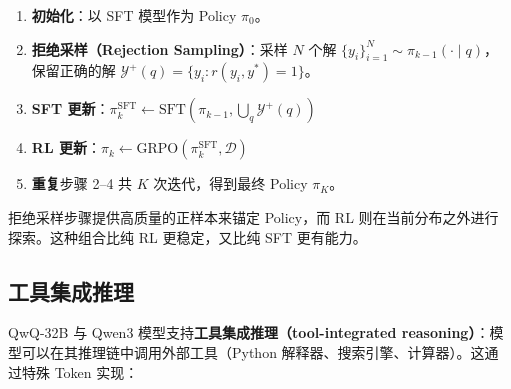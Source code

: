\begin{enumerate}
  \item \textbf{初始化}：以 SFT 模型作为 Policy $\pi_0$。
  \item \textbf{拒绝采样（Rejection Sampling）}：采样 $N$ 个解 $\{y_i\}_{i=1}^N \sim \pi_{k-1}(\cdot \mid q)$，保留正确的解 $\mathcal{Y}^+(q) = \{y_i : r(y_i, y^*) = 1\}$。
  \item \textbf{SFT 更新}：$\pi_k^{\text{SFT}} \leftarrow \text{SFT}(\pi_{k-1}, \bigcup_q \mathcal{Y}^+(q))$
  \item \textbf{RL 更新}：$\pi_k \leftarrow \text{GRPO}(\pi_k^{\text{SFT}}, \mathcal{D})$
  \item \textbf{重复}步骤 2--4 共 $K$ 次迭代，得到最终 Policy $\pi_K$。
\end{enumerate}

拒绝采样步骤提供高质量的正样本来锚定 Policy，而 RL 则在当前分布之外进行探索。这种组合比纯 RL 更稳定，又比纯 SFT 更有能力。

\subsection{工具集成推理}
\label{tool-integrated-reasoning}

QwQ-32B 与 Qwen3 模型支持\textbf{工具集成推理（tool-integrated reasoning）}：模型可以在其推理链中调用外部工具（Python 解释器、搜索引擎、计算器）。这通过特殊 Token 实现：

